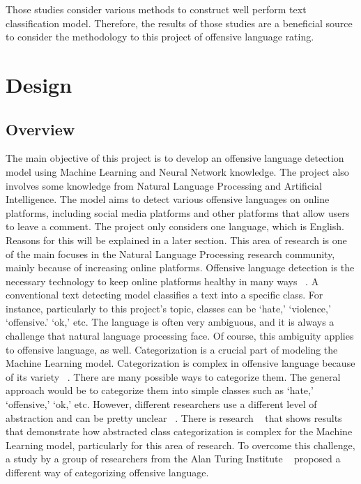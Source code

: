 \documentclass[12pt, natbib=false]{article}
\begin{document}
Those studies consider various methods to construct well perform text classification model.
Therefore, the results of those studies are a beneficial source to consider the methodology to this project of offensive language rating. 



\section{Design}
\subsection{Overview}
The main objective of this project is to develop an offensive language detection model using Machine Learning and Neural Network knowledge.
The project also involves some knowledge from Natural Language Processing and Artificial Intelligence. The model aims to detect various offensive languages on online platforms, including social media platforms and other platforms that allow users to leave a comment.
The project only considers one language, which is English.
Reasons for this will be explained in a later section.
This area of research is one of the main focuses in the Natural Language Processing research community, mainly because of increasing online platforms.
Offensive language detection is the necessary technology to keep online platforms healthy in many ways ~\cite{vidgen2019challenges}. A conventional text detecting model classifies a text into a specific class.
For instance, particularly to this project’s topic, classes can be ‘hate,’ ‘violence,’ ‘offensive.’ ‘ok,’ etc. The language is often very ambiguous, and it is always a challenge that natural language processing face.
Of course, this ambiguity applies to offensive language, as well. Categorization is a crucial part of modeling the Machine Learning model.
Categorization is complex in offensive language because of its variety ~\cite{vidgen2019challenges}.
There are many possible ways to categorize them. The general approach would be to categorize them into simple classes such as ‘hate,’ ‘offensive,’ ‘ok,’ etc. However, different researchers use a different level of abstraction and can be pretty unclear ~\cite{vidgen2019challenges}.
There is research ~\cite{malmasi2017detecting} that shows results that demonstrate how abstracted class categorization is complex for the Machine Learning model, particularly for this area of research.
To overcome this challenge, a study by a group of researchers from the Alan Turing Institute ~\cite{vidgen2019challenges} proposed a different way of categorizing offensive language.
\end{document}
